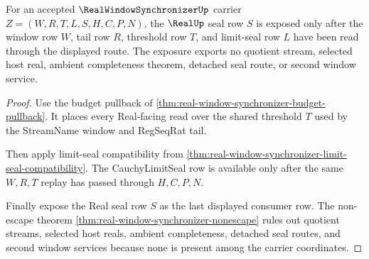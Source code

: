 \begin{theorem}
\label{thm:real-window-synchronizer-real-seal-exposure}
For an accepted $\RealWindowSynchronizerUp$ carrier $Z=(W,R,T,L,S,H,C,P,N)$, the $\RealUp$ seal row $S$ is exposed only after the window row $W$, tail row $R$, threshold row $T$, and limit-seal row $L$ have been read through the displayed route. The exposure exports no quotient stream, selected host real, ambient completeness theorem, detached seal route, or second window service.
\end{theorem}
\begin{proof}
Use the budget pullback of \autoref{thm:real-window-synchronizer-budget-pullback}. It places every Real-facing read over the shared threshold $T$ used by the StreamName window and RegSeqRat tail.

Then apply limit-seal compatibility from \autoref{thm:real-window-synchronizer-limit-seal-compatibility}. The CauchyLimitSeal row is available only after the same $W,R,T$ replay has passed through $H,C,P,N$.

Finally expose the Real seal row $S$ as the last displayed consumer row. The non-escape theorem \autoref{thm:real-window-synchronizer-nonescape} rules out quotient streams, selected host reals, ambient completeness, detached seal routes, and second window services because none is present among the carrier coordinates.
\end{proof}

